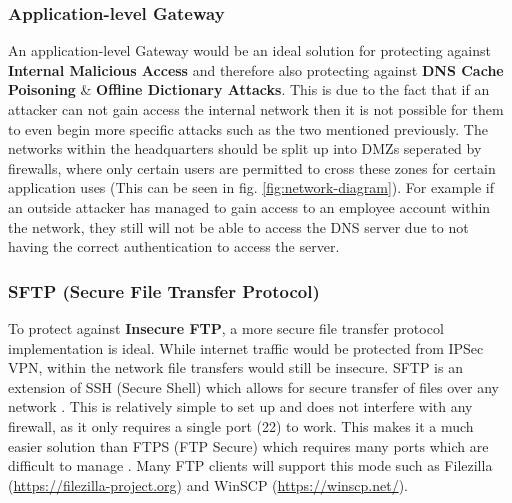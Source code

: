 \documentclass[11pt]{article}
\begin{document}
        \subsubsection{Application-level Gateway} \label{app-gateway}
          An application-level Gateway would be an ideal solution for protecting against \textbf{Internal Malicious Access} and therefore also protecting against \textbf{DNS Cache Poisoning} \& \textbf{Offline Dictionary Attacks}. This is due to the fact that if an attacker can not gain access the internal network then it is not possible for them to even begin more specific attacks such as the two mentioned previously. The networks within the headquarters should be split up into DMZs seperated by firewalls, where only certain users are permitted to cross these zones for certain application uses (This can be seen in fig. \ref{fig:network-diagram}). For example if an outside attacker has managed to gain access to an employee account within the network, they still will not be able to access the DNS server due to not having the correct authentication to access the server.

        \subsubsection{SFTP (Secure File Transfer Protocol)}
          To protect against \textbf{Insecure FTP}, a more secure file transfer protocol implementation is ideal. While internet traffic would be protected from IPSec VPN, within the network file transfers would still be insecure. SFTP is an extension of SSH (Secure Shell) which allows for secure transfer of files over any network \citep{sshSFTP}. This is relatively simple to set up and does not interfere with any firewall, as it only requires a single port (22) to work. This makes it a much easier solution than FTPS (FTP Secure) which requires many ports which are difficult to manage \citep{ga2011sftp}. Many FTP clients will support this mode such as Filezilla (\url{https://filezilla-project.org}) and WinSCP (\url{https://winscp.net/}).
\end{document}
